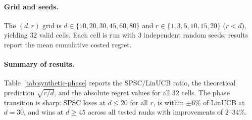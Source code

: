 \documentclass{article}
\begin{document}
{\paragraph{Grid and seeds.}
The $(d, r)$ grid is
$d \in \{10, 20, 30, 45, 60, 80\}$ and
$r \in \{1, 3, 5, 10, 15, 20\}$ ($r < d$),
yielding $32$ valid cells.
Each cell is run with $3$ independent random seeds; results report
the mean cumulative costed regret.

\paragraph{Summary of results.}
Table~\ref{tab:synthetic-phase} reports the SPSC/LinUCB ratio,
the theoretical prediction $\sqrt{r/d}$, and the absolute regret
values for all $32$ cells.
The phase transition is sharp: SPSC loses at $d \le 20$ for all $r$,
is within $\pm 6\%$ of LinUCB at $d = 30$, and wins at $d \ge 45$
across all tested ranks with improvements of $2$--$34\%$.

}
\end{document}
